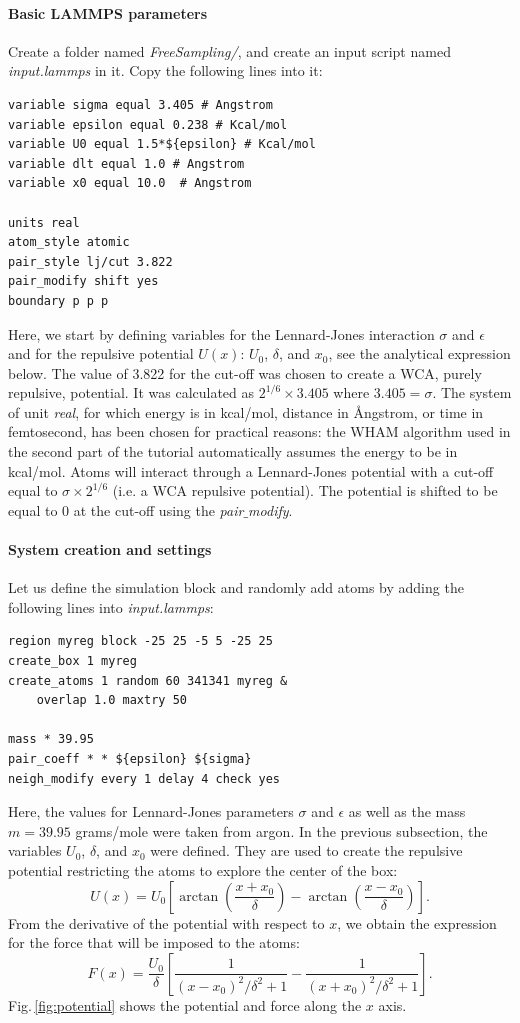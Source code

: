 \documentclass[9pt,tutorial]{livecoms}
\begin{document}
\paragraph{Basic LAMMPS parameters}
\noindent Create a folder named \textit{FreeSampling/}, and create an input script named \textit{input.lammps} in it. Copy the following lines into it:
{\normalsize \begin{verbatim}
variable sigma equal 3.405 # Angstrom
variable epsilon equal 0.238 # Kcal/mol
variable U0 equal 1.5*${epsilon} # Kcal/mol
variable dlt equal 1.0 # Angstrom
variable x0 equal 10.0  # Angstrom

units real
atom_style atomic
pair_style lj/cut 3.822
pair_modify shift yes
boundary p p p
\end{verbatim}}
Here, we start by defining variables for the Lennard-Jones interaction $\sigma$ and $\epsilon$ and for the repulsive potential $U (x)$: $U_0$, $\delta$, and $x_0$, see the analytical expression below. The value of 3.822 for the cut-off was chosen to create a WCA, purely repulsive, potential. It was calculated as $2^{1/6} \times 3.405$ where $3.405 = \sigma$. The system of unit \textit{real}, for which energy is in kcal/mol, distance in Ångstrom, or time in femtosecond, has been chosen for practical reasons: the WHAM algorithm used in the second part of the tutorial automatically assumes the energy to be in kcal/mol. Atoms will interact through a Lennard-Jones potential with a cut-off equal to $\sigma \times 2 ^ {1/6}$ (i.e. a WCA repulsive potential). The potential is shifted to be equal to 0 at the cut-off using the \textit{pair$\_$modify}.

\paragraph{System creation and settings}
\noindent Let us define the simulation block and randomly add atoms by adding the following lines into \textit{input.lammps}:
{\normalsize \begin{verbatim}
region myreg block -25 25 -5 5 -25 25
create_box 1 myreg
create_atoms 1 random 60 341341 myreg &
    overlap 1.0 maxtry 50

mass * 39.95
pair_coeff * * ${epsilon} ${sigma}
neigh_modify every 1 delay 4 check yes
\end{verbatim}}
Here, the values for Lennard-Jones parameters $\sigma$ and $\epsilon$ as well as the mass $m = 39.95$ grams/mole were taken from argon. In the previous subsection, the variables $U_0$, $\delta$, and $x_0$ were defined. They are used to create the repulsive potential restricting the atoms to explore the center of the box: 
$$U(x) = U_0 \left[ \arctan \left( \dfrac{x+x_0}{\delta} \right) - \arctan \left(\dfrac{x-x_0}{\delta} \right) \right]. $$
From the derivative of the potential with respect to $x$, we obtain the expression
for the force that will be imposed to the atoms:
$$F(x)= \dfrac{U_0}{\delta} \left[ \dfrac{1}{(x-x_0)^2/\delta^2+1} - \dfrac{1}{(x+x_0)^2/\delta^2+1} \right].$$
Fig.\,\ref{fig:potential} shows the potential and force along the $x$ axis.
\end{document}
